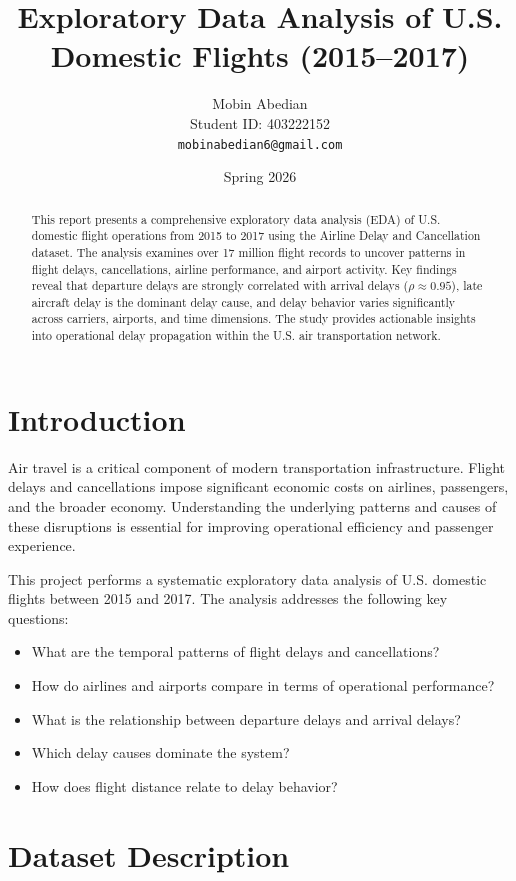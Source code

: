 \documentclass[12pt,a4paper]{article}
\title{\textbf{Exploratory Data Analysis of U.S. Domestic Flights (2015--2017)}}
\author{
    Mobin Abedian \\
    Student ID: 403222152 \\
    \texttt{mobinabedian6@gmail.com}
}
\date{Spring 2026}
\begin{document}
\maketitle

\begin{abstract}
This report presents a comprehensive exploratory data analysis (EDA) of U.S. domestic flight operations from 2015 to 2017 using the Airline Delay and Cancellation dataset. The analysis examines over 17 million flight records to uncover patterns in flight delays, cancellations, airline performance, and airport activity. Key findings reveal that departure delays are strongly correlated with arrival delays ($\rho \approx 0.95$), late aircraft delay is the dominant delay cause, and delay behavior varies significantly across carriers, airports, and time dimensions. The study provides actionable insights into operational delay propagation within the U.S. air transportation network.
\end{abstract}

\newpage
\tableofcontents
\newpage

\section{Introduction}

Air travel is a critical component of modern transportation infrastructure. Flight delays and cancellations impose significant economic costs on airlines, passengers, and the broader economy. Understanding the underlying patterns and causes of these disruptions is essential for improving operational efficiency and passenger experience.

This project performs a systematic exploratory data analysis of U.S. domestic flights between 2015 and 2017. The analysis addresses the following key questions:
\begin{itemize}
    \item What are the temporal patterns of flight delays and cancellations?
    \item How do airlines and airports compare in terms of operational performance?
    \item What is the relationship between departure delays and arrival delays?
    \item Which delay causes dominate the system?
    \item How does flight distance relate to delay behavior?
\end{itemize}

\section{Dataset Description}
\end{document}
